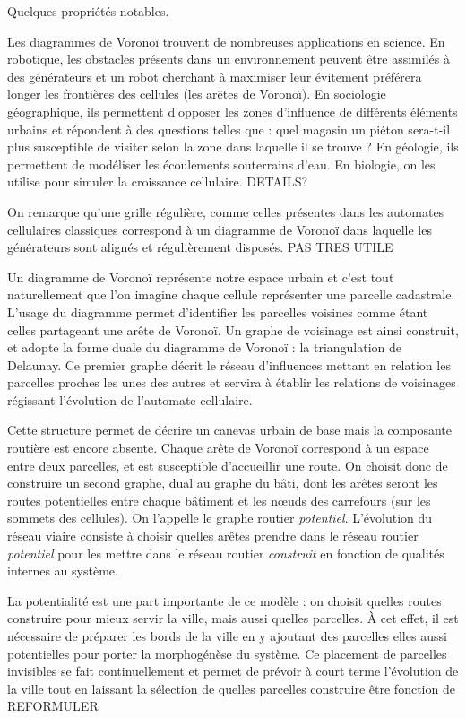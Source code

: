 \documentclass[12pt]{article}
\begin{document}
Quelques propriétés notables.

Les diagrammes de Voronoï trouvent de nombreuses applications en
science. En robotique, les obstacles présents dans un environnement
peuvent être assimilés à des générateurs et un robot cherchant à
maximiser leur évitement préférera longer les frontières des cellules
(les arêtes de Voronoï). En sociologie géographique, ils permettent
d'opposer les zones d'influence de différents éléments urbains et
répondent à des questions telles que : quel magasin un piéton
sera-t-il plus susceptible de visiter selon la zone dans laquelle il
se trouve ? En géologie, ils permettent de modéliser les écoulements
souterrains d'eau. En biologie, on les utilise pour simuler la
croissance cellulaire. DETAILS?

On remarque qu'une grille régulière, comme celles présentes dans les
automates cellulaires classiques correspond à un diagramme de Voronoï
dans laquelle les générateurs sont alignés et régulièrement
disposés. PAS TRES UTILE

Un diagramme de Voronoï représente notre espace urbain et c'est tout
naturellement que l'on imagine chaque cellule représenter une parcelle
cadastrale. L'usage du diagramme permet d'identifier les parcelles
voisines comme étant celles partageant une arête de Voronoï. Un graphe
de voisinage est ainsi construit, et adopte la forme duale du
diagramme de Voronoï : la triangulation de Delaunay. Ce premier graphe
décrit le réseau d'influences mettant en relation les parcelles
proches les unes des autres et servira à établir les relations de
voisinages régissant l'évolution de l'automate cellulaire.

Cette structure permet de décrire un canevas urbain de base mais la
composante routière est encore absente. Chaque arête de Voronoï
correspond à un espace entre deux parcelles, et est susceptible
d'accueillir une route. On choisit donc de construire un second
graphe, dual au graphe du bâti, dont les arêtes seront les routes
potentielles entre chaque bâtiment et les n\oe uds des carrefours (sur
les sommets des cellules). On l'appelle le graphe routier
\textit{potentiel}. L'évolution du réseau viaire consiste à choisir
quelles arêtes prendre dans le réseau routier \textit{potentiel} pour
les mettre dans le réseau routier \textit{construit} en fonction de
qualités internes au système.

La potentialité est une part importante de ce modèle : on choisit
quelles routes construire pour mieux servir la ville, mais aussi
quelles parcelles. À cet effet, il est nécessaire de préparer les
bords de la ville en y ajoutant des parcelles elles aussi potentielles
pour porter la morphogénèse du système. Ce placement de parcelles
invisibles se fait continuellement et permet de prévoir à court terme
l'évolution de la ville tout en laissant la sélection de quelles
parcelles construire être fonction de REFORMULER
\end{document}
